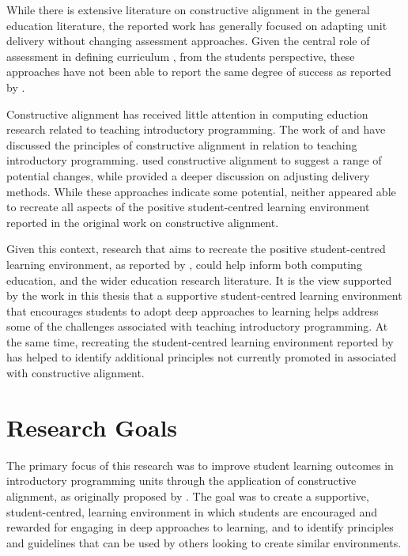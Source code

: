 While there is extensive literature on constructive alignment in the general education literature, the reported work has generally focused on adapting unit delivery without changing assessment approaches. Given the central role of assessment in defining curriculum \cite{Ramsden:1992}, from the students perspective, these approaches have not been able to report the same degree of success as reported by \citet{Biggs:1996c}.   

Constructive alignment has received little attention in computing eduction research related to teaching introductory programming. The work of \citet{Thota:2010} and \citet{Gaspar:2012} have discussed the principles of constructive alignment in relation to teaching introductory programming. \citet{Gaspar:2012} used constructive alignment to suggest a range of potential changes, while \citet{Thota:2010} provided a deeper discussion on adjusting delivery methods. While these approaches indicate some potential, neither appeared able to recreate all aspects of the positive student-centred learning environment reported in the original work on constructive alignment.

Given this context, research that aims to recreate the positive student-centred learning environment, as reported by \citet{Biggs:1996c}, could help inform both computing education, and the wider education research literature. It is the view supported by the work in this thesis that a supportive student-centred learning environment that encourages students to adopt deep approaches to learning helps address some of the challenges associated with teaching introductory programming. At the same time, recreating the student-centred learning environment reported by \citet{Biggs:1996c} has helped to identify additional principles not currently promoted in associated with constructive alignment.

\section{Research Goals} %
\label{sec:research_goals}

The primary focus of this research was to improve student learning outcomes in introductory programming units through the application of constructive alignment, as originally proposed by \citet{Biggs:1996c}. The goal was to create a supportive, student-centred, learning environment in which students are encouraged and rewarded for engaging in deep approaches to learning, and to identify principles and guidelines that can be used by others looking to create similar environments.

